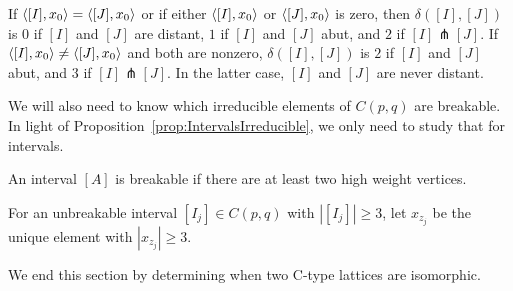 \begin{rmk}
If $\left\langle [I] , x_0 \right\rangle = \left\langle [J] , x_0 \right\rangle$ or if either $\left\langle [I] , x_0 \right\rangle$ or $\left\langle [J] , x_0 \right\rangle$ is zero, then $\delta([I],[J])$ is $0$ if $[I]$ and $[J]$ are distant, $1$ if $[I]$ and $[J]$ abut, and $2$ if $[I] \pitchfork [J]$. If $\left\langle [I] , x_0 \right\rangle \neq \left\langle [J] , x_0 \right\rangle$ and both are nonzero, $\delta([I],[J])$ is $2$ if $[I]$ and $[J]$ abut, and $3$ if $[I] \pitchfork [J]$. In the latter case, $[I]$ and $[J]$ are never distant. 
\end{rmk}

We will also need to know which irreducible elements of $C(p,q)$ are breakable. In light of Proposition~\ref{prop:IntervalsIrreducible}, we only need to study that for intervals.
\begin{lemma}\label{lem:TwoIndBr}
    An interval $[A]$ is breakable if there are at least two high weight vertices.
\end{lemma}

\begin{definition}\label{Def:Zj} 
For an unbreakable interval $[I_j] \in C(p,q)$ with $|[I_j]|\ge 3$, let $x_{z_j}$ be the unique element with $|x_{z_j}|\ge 3$.
\end{definition}
We end this section by determining when two C-type lattices are isomorphic.

